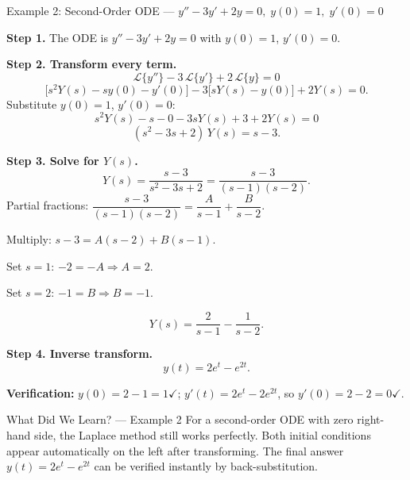 \documentclass[12pt,a4paper]{article}
\begin{document}
\begin{infobox}{Example 2: Second-Order ODE --- \(y'' - 3y' + 2y = 0,\; y(0)=1,\; y'(0)=0\)}

\textbf{Step 1.} The ODE is \(y'' - 3y' + 2y = 0\) with \(y(0)=1\), \(y'(0)=0\).

\textbf{Step 2. Transform every term.}
\[
  \mathcal{L}\{y''\} - 3\,\mathcal{L}\{y'\} + 2\,\mathcal{L}\{y\} = 0
\]
\[
  \bigl[s^2Y(s) - sy(0) - y'(0)\bigr]
  - 3\bigl[sY(s) - y(0)\bigr]
  + 2Y(s) = 0.
\]
Substitute \(y(0)=1\), \(y'(0)=0\):
\[
  s^2Y(s) - s - 0 - 3sY(s) + 3 + 2Y(s) = 0
\]
\[
  (s^2 - 3s + 2)\,Y(s) = s - 3.
\]

\textbf{Step 3. Solve for \(Y(s)\).}
\[
  Y(s) = \frac{s-3}{s^2 - 3s + 2} = \frac{s-3}{(s-1)(s-2)}.
\]
Partial fractions: \(\dfrac{s-3}{(s-1)(s-2)} = \dfrac{A}{s-1} + \dfrac{B}{s-2}\).

Multiply: \(s-3 = A(s-2)+B(s-1)\).

Set \(s=1\): \(-2 = -A \Rightarrow A=2\).

Set \(s=2\): \(-1 = B \Rightarrow B=-1\).

\[
  Y(s) = \frac{2}{s-1} - \frac{1}{s-2}.
\]

\textbf{Step 4. Inverse transform.}
\[
  y(t) = 2e^{t} - e^{2t}.
\]

\textbf{Verification:} \(y(0) = 2-1=1\checkmark\);
\(y'(t)=2e^t-2e^{2t}\), so \(y'(0)=2-2=0\checkmark\).
\end{infobox}

\begin{learnbox}{What Did We Learn? --- Example 2}
For a second-order ODE with zero right-hand side, the Laplace method still works perfectly.
Both initial conditions appear automatically on the left after transforming.
The final answer \(y(t)=2e^t - e^{2t}\) can be verified instantly by back-substitution.
\end{learnbox}
\end{document}
